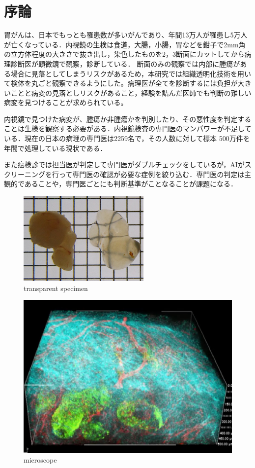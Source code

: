 \chapter{序論}
\label{chap_intro}
胃がんは、日本でもっとも罹患数が多いがんであり、年間13万人が罹患し5万人が亡くなっている．内視鏡の生検は食道，大腸，小腸，胃などを鉗子で2mm角の立方体程度の大きさで抜き出し，染色したものを2，3断面にカットしてから病理診断医が顕微鏡で観察，診断している．
断面のみの観察では内部に腫瘍がある場合に見落としてしまうリスクがあるため，本研究では組織透明化技術を用いて検体を丸ごと観察できるようにした。病理医が全てを診断するには負担が大きいことと病変の見落としリスクがあること，経験を詰んだ医師でも判断の難しい病変を見つけることが求められている。

内視鏡で見つけた病変が、腫瘍か非腫瘍かを判別したり、その悪性度を判定することは生検を観察する必要がある．内視鏡検査の専門医のマンパワーが不足している．現在の日本の病理の専門医は2259名で，その人数に対して標本 500万件を年間で処理している現状である．

また癌検診では担当医が判定して専門医がダブルチェックをしているが，AIがスクリーニングを行って専門医の確認が必要な症例を絞り込む．専門医の判定は主観的であることや，専門医ごとにも判断基準がことなることが課題になる．

\begin{figure}[H]
	\centering
	\includegraphics[width=0.7\linewidth]{fig/chapter1/lucid}
	\caption{transparent specimen}
	\label{fig:lucid}
\end{figure}

\begin{figure}[H]
	\centering
	\includegraphics[width=0.7\linewidth]{fig/chapter1/microscope}
	\caption{microscope}
	\label{fig:microscope}
\end{figure}


